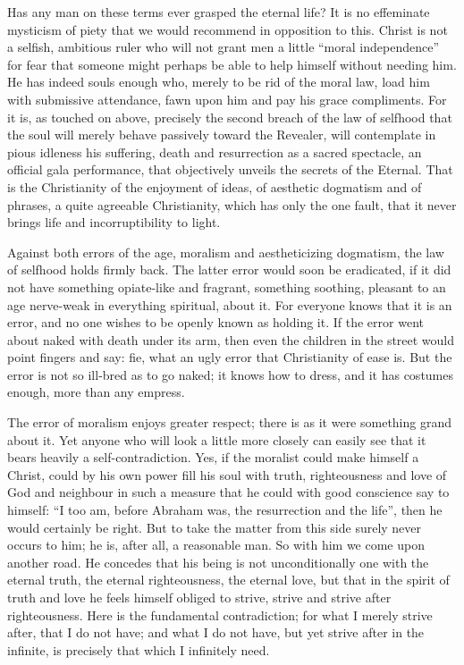 \documentclass[12pt,a4paper,openany]{book}
\newcommand{\opage}[1]{\marginnote{\footnotesize\textit{[#1]}}}
\begin{document}
Has any man on these terms ever
grasped the eternal life?  It is no effeminate mysticism of piety
that we would recommend in opposition to this.  Christ
is not a selfish, ambitious ruler who will not
grant men a little ``moral independence'' for
fear that someone might perhaps be able to help himself
without needing him.  He has indeed souls enough
who, merely to be rid of the moral law, load him
with submissive attendance, fawn upon him and pay
his grace compliments.  For it is, as touched on
above, precisely the second breach of the law of selfhood that the soul
will merely behave passively toward the Revealer, will contemplate
in pious idleness his suffering, death and resurrection as
a sacred spectacle, an official gala performance, that objectively
unveils the secrets of the Eternal.  That is the Christianity of the enjoyment of ideas,
of aesthetic dogmatism and of phrases,
a quite agreeable Christianity, which has only the one fault,
that it never brings life and incorruptibility to light.

Against both errors of the age, moralism and aestheticizing
dogmatism, the law of selfhood holds firmly back.
The latter error would soon be eradicated, if
it did not have something opiate-like and fragrant, something
soothing, pleasant to an age nerve-weak in everything spiritual,
about it.  For everyone knows that it is an error,
and no one wishes to be openly known as holding it.  If
the error went about naked with death under
\setcounter{footnote}{0}%
\opage{215}its arm, then even the children in the street would point fingers
and say: fie, what an ugly error that Christianity of
ease is.  But the error is not so ill-bred
as to go naked; it knows how to dress, and it
has costumes enough, more than any empress.

The error of moralism enjoys greater respect; there is
as it were something grand about it.  Yet anyone
who will look a little more closely can easily see that it bears heavily
a self-contradiction.  Yes, if the moralist could make
himself a Christ, could by his own power fill his
soul with truth, righteousness and love of God
and neighbour in such a measure that he could with good conscience
say to himself: ``I too am, before Abraham
was, the resurrection and the life'', then he would certainly be
right.  But to take the matter from this side surely never occurs to him;
he is, after all, a reasonable man.  So with him we
come upon another road.  He concedes
that his being is not unconditionally one with the eternal
truth, the eternal righteousness, the eternal love,
but that in the spirit of truth and love he feels himself
obliged to strive, strive and strive after righteousness.
Here is the fundamental contradiction; for what I merely strive
after, that I do not have; and what I do not have, but
yet strive after in the infinite, is precisely that which
I infinitely need.
\end{document}
